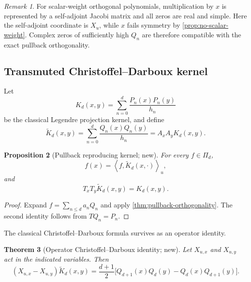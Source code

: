\documentclass[11pt,oneside]{article}
\numberwithin{equation}{section}
\newtheorem{theorem}{Theorem}[section]
\newtheorem{proposition}[theorem]{Proposition}
\theoremstyle{definition}
\theoremstyle{remark}
\newtheorem{remark}[theorem]{Remark}
\newcommand{\inner}[2]{\left\langle #1,#2\right\rangle}
\begin{document}
\begin{remark}
For scalar-weight orthogonal polynomials, multiplication by $x$ is represented
by a self-adjoint Jacobi matrix and all zeros are real and simple.  Here the
self-adjoint coordinate is $X_u$, while $x$ fails symmetry by
\cref{prop:no-scalar-weight}.  Complex zeros of sufficiently high $Q_n$ are
therefore compatible with the exact pullback orthogonality.
\end{remark}

\subsection{Transmuted Christoffel--Darboux kernel}

Let
\begin{equation}
 K_d(x,y)=\sum_{n=0}^{d}\frac{P_n(x)P_n(y)}{h_n}
 \label{eq:CD-kernel}
\end{equation}
be the classical Legendre projection kernel, and define
\begin{equation}
 \widetilde K_d(x,y)=\sum_{n=0}^{d}\frac{Q_n(x)Q_n(y)}{h_n}
 =A_xA_yK_d(x,y).
 \label{eq:deconv-kernel}
\end{equation}

\begin{proposition}[Pullback reproducing kernel; new]
\label{prop:pullback-kernel}
For every $f\in\Pi_d$,
\begin{equation}
 f(x)=\inner{f}{\widetilde K_d(x,\cdot)}_u,
 \label{eq:pullback-reproducing}
\end{equation}
and
\begin{equation}
 T_xT_y\widetilde K_d(x,y)=K_d(x,y).
 \label{eq:kernel-transmutation}
\end{equation}
\end{proposition}

\begin{proof}
Expand $f=\sum_{n\le d}a_nQ_n$ and apply
\cref{thm:pullback-orthogonality}.  The second identity follows from
$TQ_n=P_n$.
\end{proof}

The classical Christoffel--Darboux formula survives as an operator identity.

\begin{theorem}[Operator Christoffel--Darboux identity; new]
\label{thm:operator-CD}
Let $X_{u,x}$ and $X_{u,y}$ act in the indicated variables.  Then
\begin{equation}
 \boxed{
 (X_{u,x}-X_{u,y})\widetilde K_d(x,y)
 =\frac{d+1}{2}\bigl[Q_{d+1}(x)Q_d(y)-Q_d(x)Q_{d+1}(y)\bigr].}
 \label{eq:operator-CD}
\end{equation}
\end{theorem}
\end{document}
